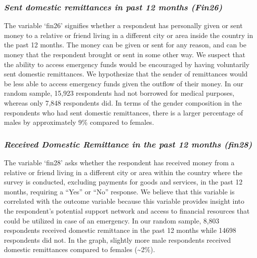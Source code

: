 \documentclass[12pt]{article}
\begin{document}
\hypertarget{sent-domestic-remittances-in-past-12-months-fin26}{%
\subsubsection{\texorpdfstring{\emph{Sent domestic remittances in past
12 months
(Fin26)}}{Sent domestic remittances in past 12 months (Fin26)}}\label{sent-domestic-remittances-in-past-12-months-fin26}}

The variable `fin26' signifies whether a respondent has personally given
or sent money to a relative or friend living in a different city or area
inside the country in the past 12 months. The money can be given or sent
for any reason, and can be money that the respondent brought or sent in
some other way. We suspect that the ability to access emergency funds
would be encouraged by having voluntarily sent domestic remittances. We
hypothesize that the sender of remittances would be less able to access
emergency funds given the outflow of their money. In our random sample,
15,923 respondents had not borrowed for medical purposes, whereas only
7,848 respondents did. In terms of the gender composition in the
respondents who had sent domestic remittances, there is a larger
percentage of males by approximately 9\% compared to females.

\hypertarget{received-domestic-remittance-in-the-past-12-months-fin28}{%
\subsubsection{\texorpdfstring{\emph{Received Domestic Remittance in the
past 12 months
(fin28)}}{Received Domestic Remittance in the past 12 months (fin28)}}\label{received-domestic-remittance-in-the-past-12-months-fin28}}

The variable `fin28' asks whether the respondent has received money from
a relative or friend living in a different city or area within the
country where the survey is conducted, excluding payments for goods and
services, in the past 12 months, requiring a ``Yes'' or ``No'' response.
We believe that this variable is correlated with the outcome variable
because this variable provides insight into the respondent's potential
support network and access to financial resources that could be utilized
in case of an emergency. In our random sample, 8,803 respondents
received domestic remittance in the past 12 months while 14698
respondents did not. In the graph, slightly more male respondents
received domestic remittances compared to females (\textasciitilde2\%).
\end{document}
